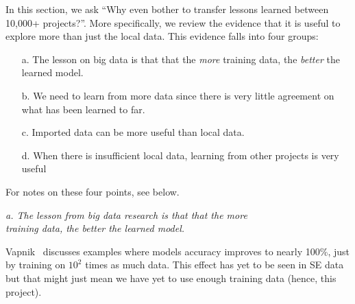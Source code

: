 \newpage
{}
In this section, we ask ``Why even bother to transfer lessons learned between  10,000+ projects?''. More specifically, we review the evidence that  it is useful to explore more than just the local data. This evidence falls into four groups:
\begin{enumerate}
\item[a.] The lesson on big data is that that the {\em more} training data, the {\em better} the learned model.
\item[b.] We need to learn from more data since 
there is very little agreement on what has been learned to far.
\item[c.]  Imported data can be more useful than local data.
\item[d.]  When there is insufficient local data,
learning from other projects is very useful
\end{enumerate}
For notes on these four points, see below.

 \begin{center}{\em a. 
 The lesson from big data research is that that the  {\em more}\\
 training data, the {\em better} the learned model.}
 \end{center}
 
 Vapnik~\cite{vapnik14} discusses examples
where models accuracy improves to nearly 100\%, just by training on $10^2$ times as much data.
 This effect has yet to be seen in SE data~\cite{menzies2013guest} but that might just mean we have yet
  to use enough training data (hence, this project). 
  

